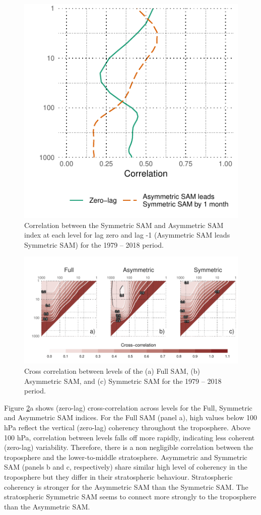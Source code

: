 \documentclass[smallextended]{svjour3}       %
\begin{document}
\begin{figure}
\includegraphics{cor-lev-1} \caption{Correlation between the Symmetric SAM and Asymmetric SAM index at each level for lag zero and lag -1 (Asymmetric SAM leads Symmetric SAM) for the 1979 -- 2018 period.}\label{fig:cor-lev}
\end{figure}

\begin{figure}
\includegraphics{cross-correlation-1} \caption{Cross correlation between levels of the (a) Full SAM, (b) Asymmetric SAM, and (c) Symmetric SAM for the 1979 -- 2018 period.}\label{fig:cross-correlation}
\end{figure}

Figure \ref{fig:cross-correlation}a shows (zero-lag) cross-correlation across levels for the Full, Symmetric and Asymmetric SAM indices. For the Full SAM (panel a), high values below 100 hPa reflect the vertical (zero-lag) coherency throughout the troposphere. Above 100 hPa, correlation between levels falls off more rapidly, indicating less coherent (zero-lag) variability. Therefore, there is a non negligible correlation between the troposphere and the lower-to-middle stratosphere. Asymmetric and Symmetric SAM (panels b and c, respectively) share similar high level of coherency in the troposphere but they differ in their stratospheric behaviour. Stratospheric coherency is stronger for the Asymmetric SAM than the Symmetric SAM. The stratospheric Symmetric SAM seems to connect more strongly to the troposphere than the Asymmetric SAM.
\end{document}
